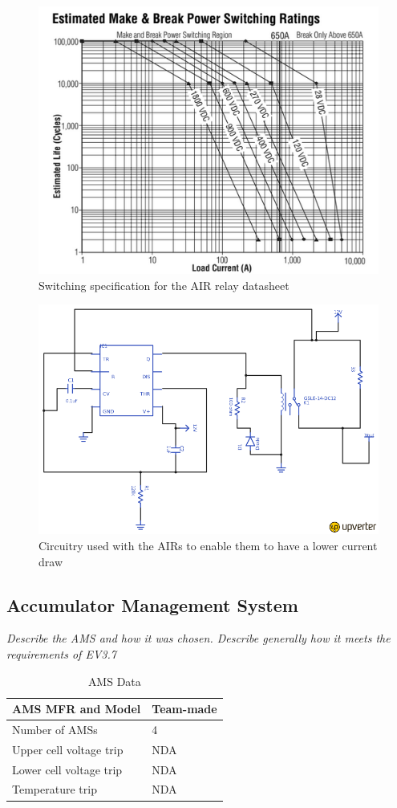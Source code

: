\documentclass{article}
\begin{document}
        \begin{figure}[H]
            \centering
            \includegraphics[width = 0.5 \textwidth]{airs}
            \caption{Switching specification for the AIR relay datasheet}
            \label{airsdata}
        \end{figure}

        \begin{figure}[H]
            \centering
            \includegraphics[width = 0.7 \textwidth]{Econcircuit}
            \caption{Circuitry used with the AIRs to enable them to have a lower current draw}
            \label{econschem}
        \end{figure}

\subsection{Accumulator Management System}

    \textit{Describe the AMS and how it was chosen. Describe generally how it meets the requirements of EV3.7}

        \begin{table}[H]
            \centering
            \begin{tabular}{|l|l|}
            \hline
            AMS MFR and Model & Team-made \\ \hline
            Number of AMSs & 4 \\ \hline
            Upper cell voltage trip & NDA \\ \hline
            Lower cell voltage trip & NDA \\ \hline
            Temperature trip & NDA \\ \hline
            \end{tabular}
            \caption{AMS Data}
            \label{amstable}
        \end{table}
\end{document}
